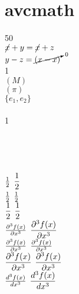\newpage
\section*{avcmath}\indent

50\eth \\

$\cancel{x} + y = \cancel{x} + z$ \\

$y - z = \cancelto{0}{(x - x)}$ \\

1\ird \\

\tr$(M)$ \\

\sgn$(\pi)$ \\

\spn$\{e_1,e_2\}$ \\

\bs \\

1\ird {}\ird \\

 \\

 \\

 \\

 \\

$\textstyle \frac {1}{2}$ $\displaystyle \frac {1}{2}$ \\

$\textstyle \tfrac{1}{2}$ $\displaystyle \tfrac{1}{2}$ \\

$\textstyle \dfrac{1}{2}$ $\displaystyle \dfrac{1}{2}$ \\

$\textstyle \frac {\partial^3f(x)}{\partial x^3}$ $\displaystyle \frac {\partial^3f(x)}{\partial x^3}$ \\

$\textstyle \tfrac{\partial^3f(x)}{\partial x^3}$ $\displaystyle \tfrac{\partial^3f(x)}{\partial x^3}$ \\

$\textstyle \dfrac{\partial^3f(x)}{\partial x^3}$ $\displaystyle \dfrac{\partial^3f(x)}{\partial x^3}$ \\

$\textstyle \frac {d ^3f(x)}{d x^3}$ $\displaystyle \frac {d ^3f(x)}{d x^3}$ \\

